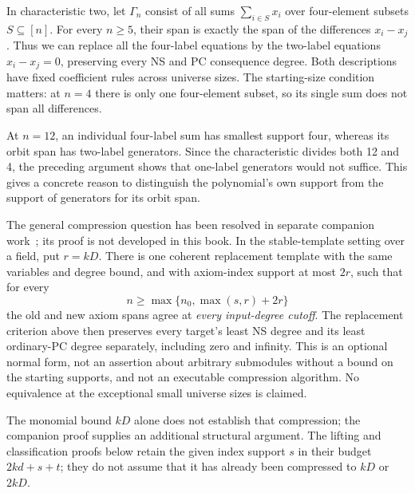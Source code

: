 \begin{example}\label{tx:eg:four-to-two}
In characteristic two, let $\Gamma_n$ consist of all sums
$\sum_{i\in S}x_i$ over four-element subsets $S\subseteq[n]$.
For every $n\ge5$, their span is exactly the span of the differences
$x_i-x_j$. Thus we can replace all the four-label equations by the
two-label equations $x_i-x_j=0$, preserving every NS and PC consequence
degree. Both descriptions have fixed coefficient rules across universe sizes.
The starting-size condition matters: at $n=4$ there is only one
four-element subset, so its single sum does not span all differences.

At $n=12$, an individual four-label sum has smallest support four,
whereas its orbit span has two-label generators. Since the characteristic
divides both 12 and 4, the preceding argument shows that one-label
generators would not suffice. This gives a concrete reason to distinguish
the polynomial's own support from the support of generators for its
orbit span.
\end{example}

The general compression question has been resolved in separate
companion work~\cite{CompressionCompanion}; its proof is not developed
in this book. In the stable-template setting over a field, put $r=kD$.
There is one coherent replacement template with the same variables
and degree bound, and with axiom-index support at most $2r$, such that
for every
\[
                  n\ge\max\{n_0,\max(s,r)+2r\}
\]
the old and new axiom spans agree at \emph{every input-degree cutoff}.
The replacement criterion above then preserves every target's least
NS degree and its least ordinary-PC degree separately, including zero
and infinity. This is an optional normal form, not an assertion about
arbitrary submodules without a bound on the starting supports, and not
an executable compression algorithm. No equivalence at the exceptional
small universe sizes is claimed.

The monomial bound $kD$ alone does not establish that compression;
the companion proof supplies an additional structural argument.
The lifting and classification proofs below retain the given index
support $s$ in their budget $2kd+s+t$; they do not assume that it has
already been compressed to $kD$ or $2kD$.

